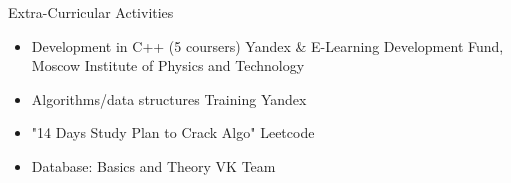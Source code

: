 \documentclass{resume} %
\begin{document}
 
\begin{rSection}{Extra-Curricular Activities} 
\begin{itemize}
    \item Development in C++ (5 coursers) \hfill
    Yandex \& E-Learning Development Fund, Moscow Institute of Physics and Technology 
    \item Algorithms/data structures Training \hfill Yandex
    \item "14 Days Study Plan to Crack Algo" \hfill Leetcode
    \item Database: Basics and Theory \hfill VK Team
\end{itemize}
 
 
\end{rSection}
 
 
 
 
 
 
\end{document}
